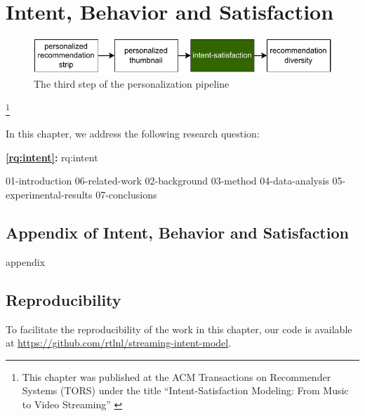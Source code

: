 
\chapter{Intent, Behavior and Satisfaction}
\label{chapter:research-intent}

\begin{figure}[ht]
  \centering
  \includegraphics{images/pipeline_step3.pdf}
  \caption{The third step of the personalization pipeline}
  \label{fig:pip3}
\end{figure}

\footnote[]{This chapter was published at the ACM Transactions on Recommender Systems (TORS) under the title ``Intent-Satisfaction Modeling: From Music to Video Streaming'' \citep{intent}}
\acresetall


In this chapter, we address the following research question:

\medskip
\noindent
\textbf{\ref{rq:intent}:} \acl{rq:intent}
\medskip

\noindent

{01-introduction}
{06-related-work}
{02-background}
{03-method}
{04-data-analysis}
{05-experimental-results}
{07-conclusions}


\begin{appendices}
\chapter{Appendix of Intent, Behavior and Satisfaction}
{appendix}
\end{appendices}




\section*{Reproducibility}
To facilitate the reproducibility of the work in this chapter, our code is available at \url{https://github.com/rtlnl/streaming-intent-model}.